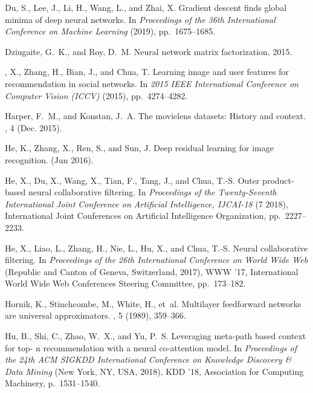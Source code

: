 \documentclass{article}
\begin{document}
\begin{thebibliography}{10}
{\sc Du, S., Lee, J., Li, H., Wang, L., and Zhai, X.}
\newblock Gradient descent finds global minima of deep neural networks.
\newblock In {\em Proceedings of the 36th International Conference on Machine
  Learning\/} (2019), pp.~1675--1685.

{\sc Dziugaite, G.~K., and Roy, D.~M.}
\newblock Neural network matrix factorization, 2015.

{, X., {Zhang}, H., {Bian}, J., and {Chua}, T.}
\newblock Learning image and user features for recommendation in social
  networks.
\newblock In {\em 2015 IEEE International Conference on Computer Vision
  (ICCV)\/} (2015), pp.~4274--4282.

{\sc Harper, F.~M., and Konstan, J.~A.}
\newblock The movielens datasets: History and context.
, 4 (Dec. 2015).

{\sc He, K., Zhang, X., Ren, S., and Sun, J.}
\newblock Deep residual learning for image recognition.
 (Jun 2016).

{\sc He, X., Du, X., Wang, X., Tian, F., Tang, J., and Chua, T.-S.}
\newblock Outer product-based neural collaborative filtering.
\newblock In {\em Proceedings of the Twenty-Seventh International Joint
  Conference on Artificial Intelligence, {IJCAI-18}\/} (7 2018), International
  Joint Conferences on Artificial Intelligence Organization, pp.~2227--2233.

{\sc He, X., Liao, L., Zhang, H., Nie, L., Hu, X., and Chua, T.-S.}
\newblock Neural collaborative filtering.
\newblock In {\em Proceedings of the 26th International Conference on World
  Wide Web\/} (Republic and Canton of Geneva, Switzerland, 2017), WWW '17,
  International World Wide Web Conferences Steering Committee, pp.~173--182.

{\sc Hornik, K., Stinchcombe, M., White, H., et~al.}
\newblock Multilayer feedforward networks are universal approximators.
, 5 (1989), 359--366.

{\sc Hu, B., Shi, C., Zhao, W.~X., and Yu, P.~S.}
\newblock Leveraging meta-path based context for top- n recommendation with a
  neural co-attention model.
\newblock In {\em Proceedings of the 24th ACM SIGKDD International Conference
  on Knowledge Discovery \& Data Mining\/} (New York, NY, USA, 2018), KDD
  ’18, Association for Computing Machinery, p.~1531–1540.


\end{thebibliography}
\end{document}
